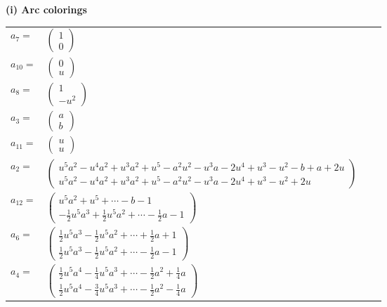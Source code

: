 \documentclass[1p]{elsarticle_modified}
\theoremstyle{definition}
\begin{document}
\flushleft \textbf{(i) Arc colorings}\\
\begin{tabular}{m{7pt} m{180pt} m{7pt} m{180pt} }
\flushright $a_{7}=$&$\begin{pmatrix}1\\0\end{pmatrix}$ \\
\flushright $a_{10}=$&$\begin{pmatrix}0\\u\end{pmatrix}$ \\
\flushright $a_{8}=$&$\begin{pmatrix}1\\- u^2\end{pmatrix}$ \\
\flushright $a_{3}=$&$\begin{pmatrix}a\\b\end{pmatrix}$ \\
\flushright $a_{11}=$&$\begin{pmatrix}u\\u\end{pmatrix}$ \\
\flushright $a_{2}=$&$\begin{pmatrix}u^5 a^2- u^4 a^2+u^3 a^2+u^5- a^2 u^2- u^3 a-2 u^4+u^3- u^2- b+a+2 u\\u^5 a^2- u^4 a^2+u^3 a^2+u^5- a^2 u^2- u^3 a-2 u^4+u^3- u^2+2 u\end{pmatrix}$ \\
\flushright $a_{12}=$&$\begin{pmatrix}u^5 a^2+u^5+\cdots- b-1\\-\frac{1}{2} u^5 a^3+\frac{1}{2} u^5 a^2+\cdots-\frac{1}{2} a-1\end{pmatrix}$ \\
\flushright $a_{6}=$&$\begin{pmatrix}\frac{1}{2} u^5 a^3-\frac{1}{2} u^5 a^2+\cdots+\frac{1}{2} a+1\\\frac{1}{2} u^5 a^3-\frac{1}{2} u^5 a^2+\cdots-\frac{1}{2} a-1\end{pmatrix}$ \\
\flushright $a_{4}=$&$\begin{pmatrix}\frac{1}{2} u^5 a^4-\frac{1}{4} u^5 a^3+\cdots-\frac{1}{2} a^2+\frac{1}{4} a\\\frac{1}{2} u^5 a^4-\frac{3}{4} u^5 a^3+\cdots-\frac{1}{2} a^2-\frac{1}{4} a\end{pmatrix}$ \\

\end{tabular}
\end{document}
